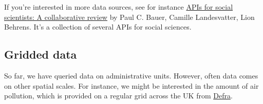 \documentclass[
  letterpaper,
]{scrbook}
\newenvironment{Shaded}{\begin{snugshade}}{\end{snugshade}}
\newcommand{\DecValTok}[1]{\textcolor[rgb]{0.68,0.00,0.00}{#1}}
\newcommand{\FunctionTok}[1]{\textcolor[rgb]{0.28,0.35,0.67}{#1}}
\newcommand{\NormalTok}[1]{\textcolor[rgb]{0.00,0.23,0.31}{#1}}
\newcommand{\OtherTok}[1]{\textcolor[rgb]{0.00,0.23,0.31}{#1}}
\newcommand{\SpecialCharTok}[1]{\textcolor[rgb]{0.37,0.37,0.37}{#1}}
\newcommand{\StringTok}[1]{\textcolor[rgb]{0.13,0.47,0.30}{#1}}
\begin{document}
\begin{Shaded}
\end{Shaded}

If you're interested in more data sources, see for instance
\href{https://bookdown.org/paul/apis_for_social_scientists/}{APIs for
social scientists: A collaborative review} by Paul C. Bauer, Camille
Landesvatter, Lion Behrens. It's a collection of several APIs for social
sciences.

\hypertarget{gridded-data}{%
\subsection{Gridded data}\label{gridded-data}}

So far, we have queried data on administrative units. However, often
data comes on other spatial scales. For instance, we might be interested
in the amount of air pollution, which is provided on a regular grid
across the UK from
\href{https://uk-air.defra.gov.uk/data/pcm-data}{Defra}.
\end{document}
